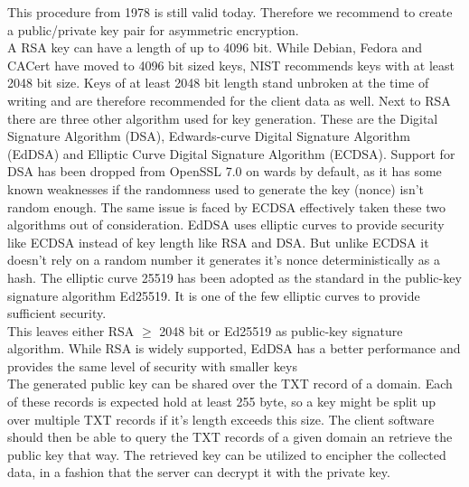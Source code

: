        This procedure from 1978 is still valid today. Therefore we recommend to create a  public/private key pair for asymmetric encryption.\\
        A RSA key can have a length of up to 4096 bit. While Debian, Fedora and CACert have moved to 4096 bit sized keys\cite{pocock_rsa_nodate}, NIST recommends keys with at least 2048 bit size\cite{barker_transitioning_2019}. Keys of at least 2048 bit length stand unbroken at the time of writing and are therefore recommended for the client data as well. 
        Next to RSA there are three other algorithm used for key generation. 
        These are the Digital Signature Algorithm (DSA), Edwards-curve Digital Signature Algorithm (EdDSA) and Elliptic Curve Digital Signature Algorithm (ECDSA)\cite{mody_comparing_2020}.
        Support for DSA has been dropped from OpenSSL 7.0 on wards by default, as it has some known weaknesses if the randomness used to generate the key (nonce) isn't random enough. The same issue is faced by ECDSA effectively taken these two algorithms out of consideration\cite{miller_ecdsa_2020}.
        EdDSA uses elliptic curves to provide security like ECDSA instead of key length like RSA and DSA. But unlike ECDSA it doesn't rely on a random number it generates it's nonce deterministically as a hash. The elliptic curve 25519 has been adopted as the standard
        in the public-key signature algorithm Ed25519. It is one of the few elliptic curves to provide sufficient security\cite{mody_comparing_2020}.\\
        This leaves either RSA $\geq$ 2048 bit or Ed25519 as public-key signature algorithm.
        While RSA is widely supported, EdDSA has a better performance and provides the same level of security with smaller keys\cite{mody_comparing_2020}\\
        
        The generated public key can be shared over the TXT record of a domain. Each of these records is expected hold at least 255 byte, so a key might be split up over multiple TXT records if it's length exceeds this size.
        The client software should then be able to query the TXT records of a given domain an retrieve the public key that way.
        The retrieved key can be utilized to encipher the collected data, in a fashion that the server can decrypt it with the private key. 
        
